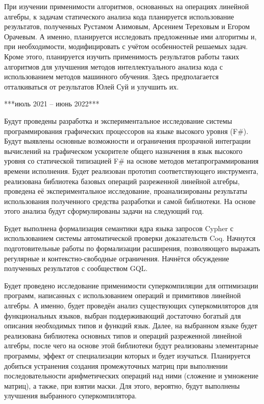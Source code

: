 \documentclass[12pt]{article}  %
\theoremstyle{remark}
\begin{document}
При изучении применимости алгоритмов, основанных на операциях линейной алгебры, к задачам статического анализа кода планируется использование результатов, полученных Рустамом Азимовым, Арсением Тереховым и Егором Орачевым. А именно, планируется исследовать предложенные ими алгоритмы и, при необходимости, модифицировать с учётом особенностей решаемых задач. Кроме этого, планируется изучить применимость результатов работы таких алгоритмов для улучшения методов интеллектуального анализа кода с использованием методов машинного обучения. Здесь предполагается отталкиваться от результатов Юлей Суй и улучшить их.


***июль 2021 -- июнь 2022***

Будут проведены разработка и экспериментальное исследование системы программирования графических процессоров на языке высокого уровня (F\#). Будут выявлены основные возможности и ограничения прозрачной интеграции вычислений на графическом ускорителе общего назначения в язык высокого уровня со статической типизацией F\# на основе методов метапрограммирования времени исполнения. Будет реализован прототип соответствующего инструмента, реализована библиотека базовых операций разреженной линейной алгебры, проведена её экспериментальное исследование, проанализированы результаты использования полученного средства разработки и самой библиотеки. На основе этого анализа будут сформулированы задачи на следующий год. 

Будет выполнена формализация семантики ядра языка запросов Cypher с использованием системы автоматической проверки доказательств Coq. Начнутся подготовительные работы по формализации расширения, позволяющего выражать регулярные и контекстно-свободные ограничения. Начнётся обсуждение полученных результатов с сообществом GQL.

Будет проведено исследование применимости суперкомпиляции для оптимизации программ, написанных с использованием операций и примитивов линейной алгебры. А именно, будет проведён анализ существующих суперкомиляторов для функциональных языков, выбран поддерживающий достаточно богатый для описания необходимых типов и функций язык. Далее, на выбранном языке будет реализована библиотека основных типов и операций разреженной линейной алгебры, после чего на основе этой библиотеки будут реализованы элементарные программы, эффект от специализации которых и будет изучаться. Планируется добиться устранения создания промежуточных матриц при выполнении последовательности арифметических операций над ними (сложение и умножение матриц), а также, при взятии маски. Для этого, вероятно, будут выполнены улучшения выбранного суперкомпилятора.
\end{document}
